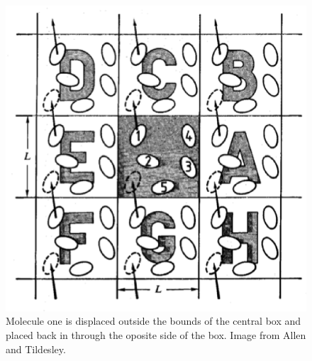 \documentclass[aip,jcp,preprint,superscriptaddress,floatfix]{revtex4-1}
\begin{document}
\begin{figure}[t]
        \includegraphics[scale = 0.5]{pbc.eps}
        \caption{Molecule one is displaced outside the bounds of the central box and placed back
        in through the oposite side of the box. Image from Allen and Tildesley. ~\cite{Allen.Book}}
        \centering
        \label{fig:pbc}
\end{figure}
\end{document}
